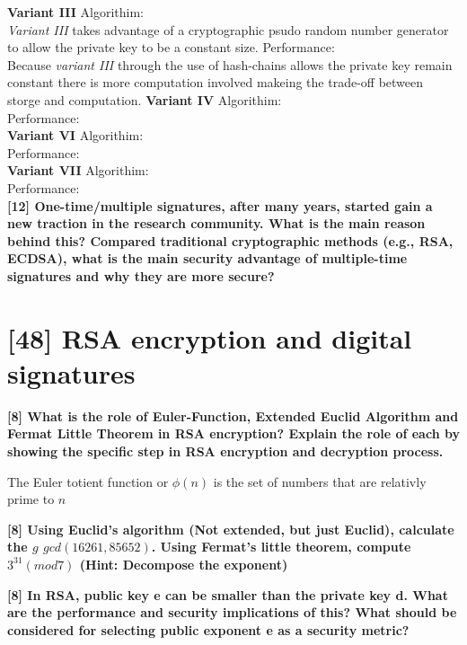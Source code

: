 \documentclass[letterpaper,11pt,notitlepage,fleqn]{article}
\begin{document}
\textbf{Variant III}
\noindent Algorithim:\\
\indent \textit{Variant III} takes advantage of a cryptographic psudo random number generator to allow the private key to be a constant size. 
\noindent Performance:\\
\indent Because \textit{variant III} through the use of hash-chains allows the private key remain constant there is more computation involved makeing the trade-off between storge and computation. 
\textbf{Variant IV}
\noindent Algorithim:\\
\indent  
\noindent Performance:\\
\textbf{Variant VI}
\noindent Algorithim:\\
\indent
\noindent Performance:\\
\textbf{Variant VII}
\noindent Algorithim:\\
\noindent Performance:\\
 

\noindent \textbf{[12] One-time/multiple signatures, after many years, started gain a new traction in  the  research  community.  What  is  the  main  reason  behind  this?  Compared traditional cryptographic methods  (e.g., RSA, ECDSA), what  is  the main security advantage of multiple-time signatures and why they are more secure?}  

\section{[48] RSA encryption and digital signatures}

\noindent \textbf{[8]  What  is  the  role  of  Euler-Function,  Extended  Euclid  Algorithm  and  Fermat Little  Theorem  in  RSA  encryption?  Explain  the  role  of  each  by  showing  the specific step in RSA encryption and decryption process.}

The Euler totient function or $\phi(n)$ is the set of numbers that are relativly prime to $n$

\noindent \textbf{[8] Using Euclid’s algorithm (Not extended, but just Euclid), calculate the $g$ $gcd(16261,  85652)$.  Using  Fermat’s  little  theorem,  compute  $3^{31}  (mod  7)$  (Hint: Decompose the exponent)} 

\noindent \textbf{[8]  In  RSA,  public  key  e  can  be  smaller  than  the  private  key  d.  What  are  the performance  and  security  implications  of  this?  What  should  be  considered  for selecting public exponent e as a security metric?}
\end{document}
